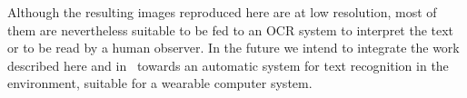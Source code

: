 \documentclass{elsart}   %
\begin{document}
Although the resulting images reproduced here are at low resolution, most of
them are nevertheless suitable to be fed to an OCR system to interpret the text
or to be read by a human observer. 
In the future we intend to integrate the work described here and
in~\cite{justin} towards an automatic system for text recognition in the
environment, suitable for a wearable computer system. 




\end{document}
